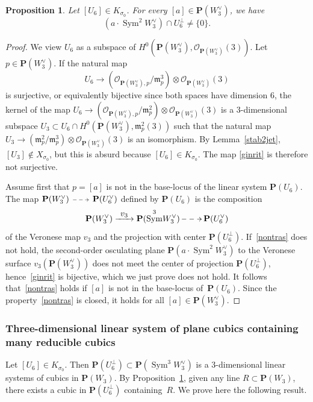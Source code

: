 \documentclass[11pt]{article}
\makeatletter
\newcommand{\Subsubsection}{\subsubsection}
\let\mathcal\mathscr
\newcommand\To[1]{\mathchoice{\xrightarrow{\textstyle\kern4pt#1\kern3pt}}{\stackrel{#1}{\longrightarrow}}{}{}}
\newcommand{\dradpl}{{\!\!\xymatrix@C=8mm{\ar@{-->}[r]&}\!\!}}
\newcommand{\dratst}{{\,\mathrel{\scalebox{.8}{$\dradpl$}}\,}}
\newcommand{\drascst}{{\,\mathrel{\scalebox{.6}{$\dradpl$}}\,}}
\newcommand{\dra}{\mathchoice{\dradpl}{\dratst}{\drascst}{\drascst}}
\newtheorem{prop}[lemm]{Proposition}
\theoremstyle{definition}
\renewcommand\P{{\mathbf P}}\let\PP\P
\newcommand\cO{\mathcal{O}}\let\OO\cO
\newcommand{\gm}{\mathfrak{m}}
\DeclareMathOperator{\Sym}{Sym}
\renewcommand{\dratst}{\mathrel{\scalebox{.8}{$\dradpl$}}}
\renewcommand{\drascst}{\mathrel{\scalebox{.6}{$\dradpl$}}}
\makeatother
\begin{document}
\begin{prop}\label{crit2jet}
Let $[U_6]\in K_{\sigma_0}$. For every $[a]\in \PP(W_3^{\vee})$, we have
\begin{equation}\label{nontras}
(a\cdot \Sym^2\! W_3^{\vee})\cap U_6^{\bot}\ne \{0\}.
\end{equation}
\end{prop}

\begin{proof}
We view $U_6$ as a subspace of $H^0(\PP(W_3^{\vee}),\cO_{\PP(W_3^{\vee})}(3))$. Let $p\in\PP(W_3^{\vee})$. If the natural map
\begin{equation}\label{ginrit}
U_6\to (\cO_{\PP(W_3^{\vee}),p}/\gm_{p}^3 )\otimes \cO_{\PP(W_3^{\vee})}(3)
\end{equation}
is surjective, or equivalently bijective since both spaces have dimension $6$, the kernel of the map $U_6\to (\cO_{\PP(W_3^{\vee}),p}/\gm_{p}^2) \otimes \cO_{\PP(W_3^{\vee})}(3)$ is a $3$-dimensional subspace $U_3\subset U_6\cap H^0(\PP(W_3^{\vee}),\gm_{p}^2(3))$ such that the natural map $U_3\to (\gm_p^2/ \gm_p^3)\otimes \cO_{\PP(W_3^{\vee})}(3)$ is an isomorphism. By Lemma~\ref{stab2jet}, $[U_3]\notin X_{\sigma_0}$, but this is absurd because $[U_6]\in K_{\sigma_0}$. The map \eqref{ginrit} is therefore not surjective.

Assume first that $p=[a]$ is not in the base-locus of the linear system $\PP(U_6)$. The map $\PP(W_3^{\vee})\dra \PP(U_6^{\vee})$ defined by $\PP(U_6)$ is the composition
\[
\PP(W_3^{\vee}) \To{v_3}
\PP(\Sym^3\! W^{\vee}_3) \dra \PP(U_6^{\vee})
\]
of the Veronese map $v_3$ and the projection with center $\PP(U_6^{\bot})$. If~\eqref{nontras} does not hold, the second-order osculating plane $\P(a\cdot \Sym^2\! W_3^{\vee})$ to the Veronese surface $v_3(\PP(W_3^{\vee}))$ does not meet the center of projection $\PP(U_6^{\bot})$, hence~\eqref{ginrit} is bijective, which we just prove does not hold. It follows that~\eqref{nontras} holds if
$[a]$ is not in the base-locus of~$\PP(U_6)$. Since the property~\eqref{nontras} is closed, it holds for all $[a]\in \P(W_3^{\vee})$.
\end{proof}

\Subsubsection{Three-dimensional linear system of plane cubics containing many reducible cubics}
Let $[U_6]\in K_{\sigma_0}$. Then $\P(U^{\bot}_6)\subset \P(\Sym^3\! W_3^{\vee})$ is a $3$-dimensional linear systems of cubics in $\PP(W_3)$. By Proposition~\ref{crit2jet}, given any line $R\subset \PP(W_3)$, there exists a cubic in $\PP(U^{\bot}_6)$ containing~$R$. We prove here the following result.
\end{document}
